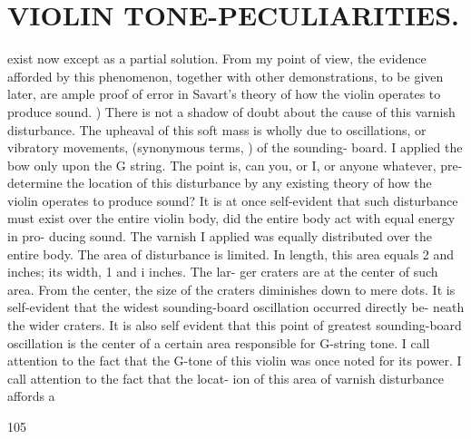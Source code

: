 \documentclass{article}
\begin{document}
\section*{VIOLIN TONE-PECULIARITIES.}
exist now except as a partial solution. From my point of view, the evidence afforded by this phenomenon, together with other demonstrations, to be given later, are ample proof of error in Savart's theory of how the violin operates to produce sound. ) There is not a shadow of doubt about the cause of this varnish disturbance. The upheaval of this soft mass is wholly due to oscillations, or vibratory movements, (synonymous terms, ) of the sounding- board. I applied the bow only upon the G string. The point is, can you, or I, or anyone whatever, pre-determine the location of this disturbance by any existing theory of how the violin operates to produce sound? It is at once self-evident that such disturbance must exist over the entire violin body, did the entire body act with equal energy in pro- ducing sound. The varnish I applied was equally distributed over the entire body. The area of disturbance is limited. In length, this area equals 2 and inches; its width, 1 and i inches. The lar- ger craters are at the center of such area. From the center, the size of the craters diminishes down to mere dots. It is self-evident that the widest sounding-board oscillation occurred directly be- neath the wider craters. It is also self evident that this point of greatest sounding-board oscillation is the center of a certain area responsible for G-string tone. I call attention to the fact that the G-tone of this violin was once noted for its power. I call attention to the fact that the locat- ion of this area of varnish disturbance affords a

105
\end{document}
